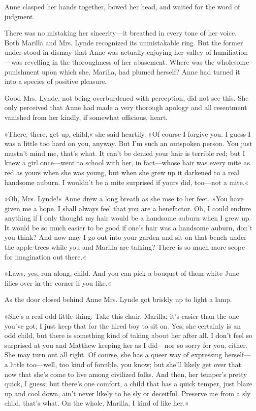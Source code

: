 Anne clasped her hands together, bowed her head, and waited for the word of judgment.

There was no mistaking her sincerity—it breathed in every tone of her voice. Both Marilla and Mrs. Lynde recognized its unmistakable ring. But the former under-stood in dismay that Anne was actually enjoying her valley of humiliation—was revelling in the thoroughness of her abasement. Where was the wholesome punishment upon which she, Marilla, had plumed herself? Anne had turned it into a species of positive pleasure.

Good Mrs. Lynde, not being overburdened with perception, did not see this. She only perceived that Anne had made a very thorough apology and all resentment vanished from her kindly, if somewhat officious, heart.

»There, there, get up, child,« she said heartily. »Of course I forgive you. I guess I was a little too hard on you, anyway. But I’m such an outspoken person. You just mustn’t mind me, that’s what. It can’t be denied your hair is terrible red; but I knew a girl once—went to school with her, in fact—whose hair was every mite as red as yours when she was young, but when she grew up it darkened to a real handsome auburn. I wouldn’t be a mite surprised if yours did, too—not a mite.«

»Oh, Mrs. Lynde!« Anne drew a long breath as she rose to her feet. »You have given me a hope. I shall always feel that you are a benefactor. Oh, I could endure anything if I only thought my hair would be a handsome auburn when I grew up. It would be so much easier to be good if one’s hair was a handsome auburn, don’t you think? And now may I go out into your garden and sit on that bench under the apple-trees while you and Marilla are talking? There is so much more scope for imagination out there.«

»Laws, yes, run along, child. And you can pick a bouquet of them white June lilies over in the corner if you like.«

As the door closed behind Anne Mrs. Lynde got briskly up to light a lamp.

»She’s a real odd little thing. Take this chair, Marilla; it’s easier than the one you’ve got; I just keep that for the hired boy to sit on. Yes, she certainly is an odd child, but there is something kind of taking about her after all. I don’t feel so surprised at you and Matthew keeping her as I did—nor so sorry for you, either. She may turn out all right. Of course, she has a queer way of expressing herself—a little too—well, too kind of forcible, you know; but she’ll likely get over that now that she’s come to live among civilized folks. And then, her temper’s pretty quick, I guess; but there’s one comfort, a child that has a quick temper, just blaze up and cool down, ain’t never likely to be sly or deceitful. Preserve me from a sly child, that’s what. On the whole, Marilla, I kind of like her.«

